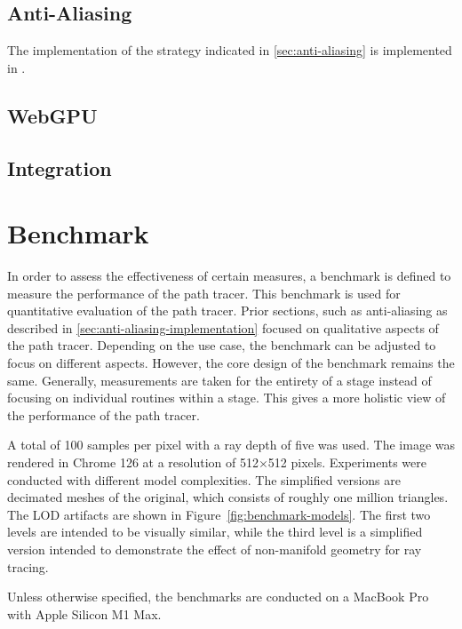 \subsection{Anti-Aliasing}

The implementation of the strategy indicated in \ref{sec:anti-aliasing} is implemented in .


\subsection{WebGPU}
\subsection{Integration}

\section{Benchmark}

In order to assess the effectiveness of certain measures, a benchmark is defined to measure the performance of the path tracer. This benchmark is used for quantitative evaluation of the path tracer. Prior sections, such as anti-aliasing as described in \autoref{sec:anti-aliasing-implementation} focused on qualitative aspects of the path tracer. Depending on the use case, the benchmark can be adjusted to focus on different aspects. However, the core design of the benchmark remains the same. Generally, measurements are taken for the entirety of a stage instead of focusing on individual routines within a stage. This gives a more holistic view of the performance of the path tracer.

A total of 100 samples per pixel with a ray depth of five was used. The image was rendered in Chrome 126 at a resolution of 512$\times$512 pixels. Experiments were conducted with different model complexities. The simplified versions are decimated meshes of the original, which consists of roughly one million triangles. The LOD artifacts are shown in Figure~\ref{fig:benchmark-models}. The first two levels are intended to be visually similar, while the third level is a simplified version intended to demonstrate the effect of non-manifold geometry for ray tracing.

Unless otherwise specified, the benchmarks are conducted on a MacBook Pro with Apple Silicon M1 Max.

